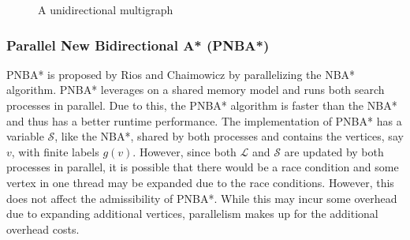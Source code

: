     \begin{figure}
        \caption{A unidirectional multigraph}
        \label{uni-multigraph1}
        \begin{center}
        \end{center}
        
    \end{figure}

\subsubsection{Parallel New Bidirectional A* (PNBA*)}
PNBA* is proposed by Rios and Chaimowicz by parallelizing the NBA* algorithm.\cite{Rios2011}
PNBA* leverages on a shared memory model and runs both search processes in parallel. Due to this, the PNBA* algorithm is 
faster than the NBA* and thus has a better runtime performance. The implementation of PNBA* has a variable $\mathcal{S}$, like the 
NBA*, shared by both processes and contains the vertices, say $v$, with finite labels $g(v)$. However, since both $\mathcal{L}$
and $\mathcal{S}$ are updated by both processes in parallel, it is possible that there would be a race condition and some vertex 
in one thread may be expanded due to the race conditions. However, this does not affect the admissibility of PNBA*.
While this may incur some overhead due to expanding additional vertices, parallelism makes up for the additional overhead costs.\cite{Rios2011}

